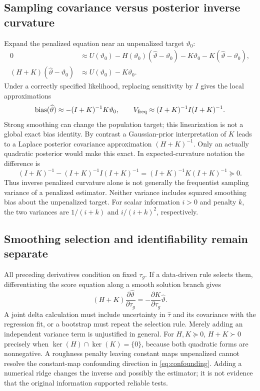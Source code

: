 \documentclass[11pt,a4paper]{article}
\numberwithin{equation}{section}
\begin{document}
\subsection{Sampling covariance versus posterior inverse curvature}
Expand the penalized equation near an unpenalized target $\vartheta_0$:
\begin{align}
 0&\approx U(\vartheta_0)-H(\vartheta_0)(\widehat\vartheta-\vartheta_0)
                 -K\vartheta_0-K(\widehat\vartheta-\vartheta_0),\\
 (H+K)(\widehat\vartheta-\vartheta_0)&\approx U(\vartheta_0)-K\vartheta_0 .
\end{align}
Under a correctly specified likelihood, replacing sensitivity by $I$
gives the local approximations
\begin{equation}
 \operatorname{bias}(\widehat\vartheta)\approx-(I+K)^{-1}K\vartheta_0,\qquad
 V_{\rm freq}\approx(I+K)^{-1}I(I+K)^{-1}.
 \label{eq:penalty-frequentist}
\end{equation}
Strong smoothing can change the population target; this linearization
is not a global exact bias identity.
By contrast a Gaussian-prior interpretation of $K$ leads to a Laplace
posterior covariance approximation $(H+K)^{-1}$.
Only an actually quadratic posterior would make this exact.
In expected-curvature notation the difference is
\begin{equation}
 (I+K)^{-1}-(I+K)^{-1}I(I+K)^{-1}
 =(I+K)^{-1}K(I+K)^{-1}\succeq0.
\end{equation}
Thus inverse penalized curvature alone is not generally the frequentist
sampling variance of a penalized estimator. Neither variance includes
squared smoothing bias about the unpenalized target.
For scalar information $i>0$ and penalty $k$, the two variances are
$1/(i+k)$ and $i/(i+k)^2$, respectively.

\subsection{Smoothing selection and identifiability remain separate}
All preceding derivatives condition on fixed $\tau_g$.
If a data-driven rule selects them, differentiating the score equation
along a smooth solution branch gives
\begin{equation}
 (H+K)\frac{\partial\widehat\vartheta}{\partial\tau_g}
 =-\frac{\partial K}{\partial\tau_g}\widehat\vartheta .
\end{equation}
A joint delta calculation must include uncertainty in $\widehat\tau$
and its covariance with the regression fit, or a bootstrap must repeat
the selection rule. Merely adding an independent variance term is
unjustified in general.
For $H,K\succeq0$, $H+K\succ0$ precisely when
$\ker(H)\cap\ker(K)=\{0\}$, because both quadratic forms are nonnegative.
A roughness penalty leaving constant maps unpenalized cannot resolve
the constant-map confounding direction in \eqref{eq:confounding}.
Adding a numerical ridge changes the inverse and possibly the estimator;
it is not evidence that the original information supported reliable tests.
\end{document}
